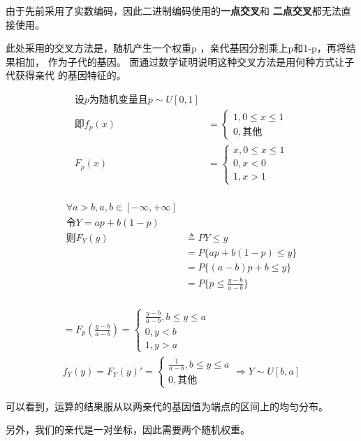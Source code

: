 \documentclass[UTF8]{ctexart}
\begin{document}
由于先前采用了实数编码，因此二进制编码使用的\textbf{一点交叉}和
\textbf{二点交叉}都无法直接使用。

此处采用的交叉方法是，随机产生一个权重p
，亲代基因分别乘上p和1-p，再将结果相加，
作为子代的基因。
面通过数学证明说明这种交叉方法是用何种方式让子代获得亲代
的基因特征的。

\[
\begin{aligned}
\text{设}p\text{为随机变量且}p\sim U[0, 1] \\
\text{即}f_p(x) &=
\begin{cases}
    1, 0 \le x \le 1 \\
    0, \text{其他}
\end{cases}\\
F_p(x) &=
\begin{cases}
    x, 0 \le x \le 1 \\
    0, x < 0\\
    1, x > 1
\end{cases}\\
\end{aligned}
\]

\[
\begin{aligned}
\forall a > b, a, b \in [-\infty, +\infty]\\
\text{令}Y = ap + b(1 - p)\\
\text{则}F_Y(y) &\triangleq P{Y \le y}\\
&= P\{ap + b(1 - p) \le y\}\\
&= P\{(a - b)p + b \le y\}\\
&= P\{p \le \frac{y - b}{a - b}\}\\
\end{aligned}
\]

\[
\begin{aligned}
= F_p(\frac{y - b}{a - b})
= \begin{cases}
\frac{y - b}{a - b}, b \le y \le a\\
0, y < b\\
1, y > a
\end{cases}\\
f_Y(y) = F_Y(y)' = \begin{cases}
    \frac{1}{a - b}, b \le y \le a\\
    0, \text{其他}
\end{cases}
\Rightarrow Y \sim U[b, a]
\end{aligned}
\]

可以看到，运算的结果服从以两亲代的基因值为端点的区间上的均匀分布。

另外，我们的亲代是一对坐标，因此需要两个随机权重。
\end{document}
